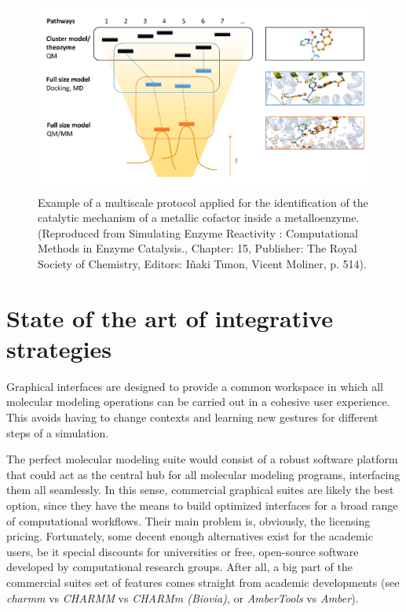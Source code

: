 \begin{figure}[H]
		\includegraphics[width=\textwidth]{./figures/01/multiscaleprotocol.png}
		\caption[Example of a multiscale protocol]{Example of a multiscale protocol applied for the identification of the catalytic mechanism of a metallic cofactor inside a metalloenzyme.\cite{victor2014} (Reproduced from Simulating Enzyme Reactivity : Computational Methods in Enzyme Catalysis., Chapter: 15, Publisher: The Royal Society of Chemistry, Editors: Iñaki Tunon, Vicent Moliner, p. 514).}
		\label{fig:multiscale}
\end{figure}

\section{State of the art of integrative strategies}



Graphical interfaces are designed to provide a common workspace in which all molecular modeling operations can be carried out in a cohesive user experience. This avoids having to change contexts and learning new gestures for different steps of a simulation.

The perfect molecular modeling suite would consist of a robust software platform that could act as the central hub for all molecular modeling programs, interfacing them all seamlessly. In this sense, commercial graphical suites are likely the best option, since they have the means to build optimized interfaces for a broad range of computational workflows. Their main problem is, obviously, the licensing pricing. Fortunately, some decent enough alternatives exist for the academic users, be it special discounts for universities or free, open-source software developed by computational research groups. After all, a big part of the commercial suites set of features comes straight from academic developments (see \textit{charmm} vs \textit{CHARMM} vs \textit{CHARMm (Biovia)}, or \textit{AmberTools} vs \textit{Amber}).

